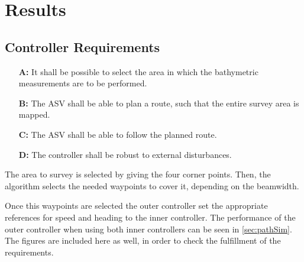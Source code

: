 \chapter{Results}\label{chap:results}

\section{Controller Requirements}
\begin{itemize}
  \item[\textbf{A:}] It shall be possible to select the area in which the bathymetric measurements are to be performed.
  \item[\textbf{B:}] The ASV shall be able to plan a route, such that the entire survey area is mapped.
  \item[\textbf{C:}] The ASV shall be able to follow the planned route.
  \item[\textbf{D:}] The controller shall be robust to external disturbances.
\end{itemize}

The area to survey is selected by giving the four corner points. Then, the algorithm selects the needed waypoints to cover it, depending on the beamwidth.

Once this waypoints are selected the outer controller set the appropriate references for speed and heading to the inner controller. The performance of the outer controller when using both inner controllers can be seen in \autoref{sec:pathSim}. The figures are included here as well, in order to check the fulfillment of the requirements.


